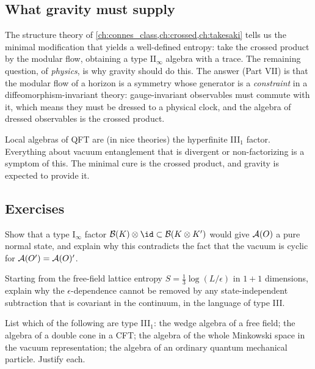 \subsection{What gravity must supply}

The structure theory of \cref{ch:connes_class,ch:crossed,ch:takesaki} tells us the minimal modification that yields a well-defined entropy: take the crossed product by the modular flow, obtaining a type II$_\infty$ algebra with a trace. The remaining question, of \emph{physics}, is why gravity should do this. The answer (Part VII) is that the modular flow of a horizon is a symmetry whose generator is a \emph{constraint} in a diffeomorphism-invariant theory: gauge-invariant observables must commute with it, which means they must be dressed to a physical clock, and the algebra of dressed observables is the crossed product.

\begin{keyidea}
Local algebras of QFT are (in nice theories) the hyperfinite III$_1$ factor. Everything about vacuum entanglement that is divergent or non-factorizing is a symptom of this. The minimal cure is the crossed product, and gravity is expected to provide it.
\end{keyidea}

\subsection*{Exercises}
\begin{exercise}\label{ex:typeIII_local:1}
Show that a type I$_\infty$ factor $\Bnd K\otimes\id\subset\Bnd{K\otimes K'}$ would give $\mathcal{A}(O)$ a pure normal state, and explain why this contradicts the fact that the vacuum is cyclic for $\mathcal{A}(O')=\mathcal{A}(O)'$.
\end{exercise}
\begin{exercise}\label{ex:typeIII_local:2}
Starting from the free-field lattice entropy $S=\frac13\log(L/\epsilon)$ in $1+1$ dimensions, explain why the $\epsilon$-dependence cannot be removed by any state-independent subtraction that is covariant in the continuum, in the language of type III.
\end{exercise}
\begin{exercise}\label{ex:typeIII_local:3}
List which of the following are type III$_1$: the wedge algebra of a free field; the algebra of a double cone in a CFT; the algebra of the whole Minkowski space in the vacuum representation; the algebra of an ordinary quantum mechanical particle. Justify each.
\end{exercise}

